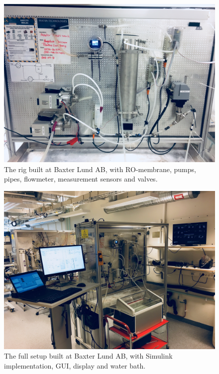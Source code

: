 \begin{figure}[H]
    \centering
    \includegraphics[width=1\textwidth]{Rig1}
    \caption{The rig built at Baxter Lund AB, with RO-membrane, pumps, pipes, flowmeter, measurement sensors and valves.}
    \label{fig:Rig1}
\end{figure}
\begin{figure}[H]
    \centering
    \includegraphics[width=1\textwidth]{Rig2}
    \caption{The full setup built at Baxter Lund AB, with Simulink implementation, GUI, display and water bath.}
    \label{fig:Rig2}
\end{figure}
